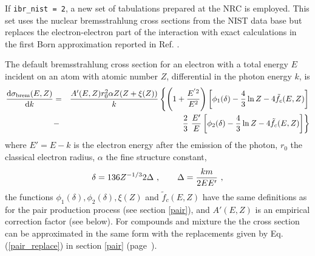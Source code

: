 \noindent
If {\tt ibr\_nist = 2}, a new set of tabulations prepared at the NRC is employed.
This set uses the nuclear bremsstrahlung cross sections from the NIST data base \cite{SB85,SB86a}
but replaces the electron-electron part of the interaction with exact calculations
in the first Born approximation reported in Ref. \cite{TK08}.

The default bremsstrahlung cross section for an electron with a
total energy $E$ incident on an atom with atomic number $Z$,
differential in the photon energy $k$, is
\begin{eqnarray}
\label{brems_cs}
{{\rm d} \sigma_{\rm brem}(E,Z) \over {\rm d} k} & = & {A'(E,Z) r_0^2 \alpha
Z (Z + \xi(Z)) \over k} \left\{ \left(1 + {E^{' 2} \over E^2} \right)
\left[ \phi_1(\delta) - \frac{4}{3} \ln Z - 4 \tilde{f}_c(E,Z) \right]
\right. \nonumber \\ & - & \left.
\frac{2}{3}~\frac{E'}{E} \left[\phi_2(\delta) -
\frac{4}{3} \ln Z - 4 \tilde{f}_c(E,Z) \right]
\right\}
\end{eqnarray}
where $E' = E-k$ is the electron energy after the emission of the photon,
$r_0$ the classical electron radius, $\alpha$ the fine structure constant,
\begin{equation}
\delta = 136 Z^{-1/3} 2 \Delta~,\quad \quad \Delta = {k m \over 2 E E'}~,
\end{equation}
the functions $\phi_1(\delta), \phi_2(\delta), \xi(Z)$ and
$\tilde{f}_c(E,Z)$ have the same definitions as for the
pair production process (see section \ref{pair}),
and $A'(E,Z)$ is an empirical correction factor (see below).
For compounds and mixture the the cross section can be
approximated in the same form with the replacements given
by Eq. (\ref{pair_replace}) in section \ref{pair} (page~\pageref{pair}).

